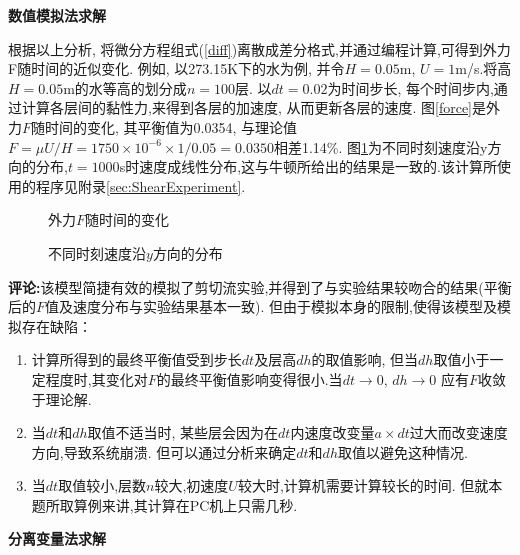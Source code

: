 \begin{solution}
\noindent\textbf{数值模拟法求解}

根据以上分析, 将微分方程组式(\ref{diff})离散成差分格式,并通过编程计算,可得到外力F随时间的近似变化. 例如, 以273.15K下的水为例, 并令$H=0.05$m, $U=1$m/s.将高$H=0.05$m的水等高的划分成$n = 100$层. 以$dt = 0.02$为时间步长, 每个时间步内,通过计算各层间的黏性力,来得到各层的加速度, 从而更新各层的速度. 图\ref{force}是外力$F$随时间的变化, 其平衡值为0.0354, 与理论值$F=\mu U/H = 1750\times 10^{-6}\times 1/0.05 = 0.0350$相差1.14\%. 图\ref{velocity}为不同时刻速度沿y方向的分布,$t=1000$s时速度成线性分布,这与牛顿所给出的结果是一致的.该计算所使用的程序见附录\ref{sec:ShearExperiment}.

\begin{figure}[!htb]
\begin{minipage}[c]{.5\textwidth}
\centering

\caption{\label{force}外力$F$随时间的变化}
\end{minipage}%
\begin{minipage}[c]{.5\textwidth}
\centering

\caption{\label{velocity}不同时刻速度沿$y$方向的分布}
\end{minipage}
\end{figure}
\textbf{评论:}该模型简捷有效的模拟了剪切流实验,并得到了与实验结果较吻合的结果(平衡后的$F$值及速度分布与实验结果基本一致).
但由于模拟本身的限制,使得该模型及模拟存在缺陷：

\begin{enumerate}
\item 计算所得到的最终平衡值受到步长$dt$及层高$dh$的取值影响,
但当$dh$取值小于一定程度时,其变化对$F$的最终平衡值影响变得很小.当$dt\rightarrow 0$, $dh\rightarrow 0$ 应有$F$收敛于理论解.
\item 当$dt$和$dh$取值不适当时,
某些层会因为在$dt$内速度改变量$a\times dt$过大而改变速度方向,导致系统崩溃. 但可以通过分析来确定$dt$和$dh$取值以避免这种情况.
\item 当$dt$取值较小,层数$n$较大,初速度$U$较大时,计算机需要计算较长的时间. 但就本题所取算例来讲,其计算在PC机上只需几秒.
\end{enumerate}

\noindent\textbf{分离变量法求解}


\end{solution}
